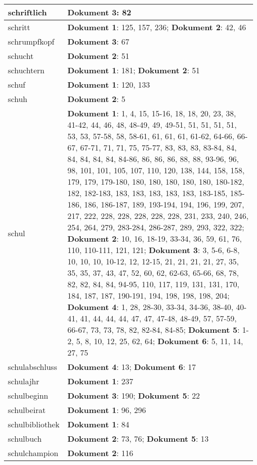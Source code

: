 \documentclass[a5paper]{article}
\begin{document}
\begin{longtable}[l]{|l|p{3in}|}
\hline
schriftlich & \textbf{Dokument 3}: 82 \\
\hline
schritt & \textbf{Dokument 1}: 125, 157, 236; \textbf{Dokument 2}: 42, 46 \\
\hline
schrumpfkopf & \textbf{Dokument 3}: 67 \\
\hline
schucht & \textbf{Dokument 2}: 51 \\
\hline
schuchtern & \textbf{Dokument 1}: 181; \textbf{Dokument 2}: 51 \\
\hline
schuf & \textbf{Dokument 1}: 120, 133 \\
\hline
schuh & \textbf{Dokument 2}: 5 \\
\hline
schul & \textbf{Dokument 1}: 1, 4, 15, 15-16, 18, 18, 20, 23, 38, 41-42, 44, 46, 48, 48-49, 49, 49-51, 51, 51, 51, 51, 53, 53, 57-58, 58, 58-61, 61, 61, 61, 61-62, 64-66, 66-67, 67-71, 71, 71, 75, 75-77, 83, 83, 83, 83-84, 84, 84, 84, 84, 84, 84-86, 86, 86, 86, 88, 88, 93-96, 96, 98, 101, 101, 105, 107, 110, 120, 138, 144, 158, 158, 179, 179, 179-180, 180, 180, 180, 180, 180, 180-182, 182, 182-183, 183, 183, 183, 183, 183, 183-185, 185-186, 186, 186-187, 189, 193-194, 194, 196, 199, 207, 217, 222, 228, 228, 228, 228, 228, 231, 233, 240, 246, 254, 264, 279, 283-284, 286-287, 289, 293, 322, 322; \textbf{Dokument 2}: 10, 16, 18-19, 33-34, 36, 59, 61, 76, 110, 110-111, 121, 121; \textbf{Dokument 3}: 3, 5-6, 6-8, 10, 10, 10, 10-12, 12, 12-15, 21, 21, 21, 21, 27, 35, 35, 35, 37, 43, 47, 52, 60, 62, 62-63, 65-66, 68, 78, 82, 82, 84, 84, 94-95, 110, 117, 119, 131, 131, 170, 184, 187, 187, 190-191, 194, 198, 198, 198, 204; \textbf{Dokument 4}: 1, 28, 28-30, 33-34, 34-36, 38-40, 40-41, 41, 44, 44, 44, 47, 47, 47-48, 48-49, 57, 57-59, 66-67, 73, 73, 78, 82, 82-84, 84-85; \textbf{Dokument 5}: 1-2, 5, 8, 10, 12, 25, 62, 64; \textbf{Dokument 6}: 5, 11, 14, 27, 75 \\
\hline
schulabschluss & \textbf{Dokument 4}: 13; \textbf{Dokument 6}: 17 \\
\hline
schulajhr & \textbf{Dokument 1}: 237 \\
\hline
schulbeginn & \textbf{Dokument 3}: 190; \textbf{Dokument 5}: 22 \\
\hline
schulbeirat & \textbf{Dokument 1}: 96, 296 \\
\hline
schulbibliothek & \textbf{Dokument 1}: 84 \\
\hline
schulbuch & \textbf{Dokument 2}: 73, 76; \textbf{Dokument 5}: 13 \\
\hline
schulchampion & \textbf{Dokument 2}: 116 \\
\hline

\end{longtable}
\end{document}
